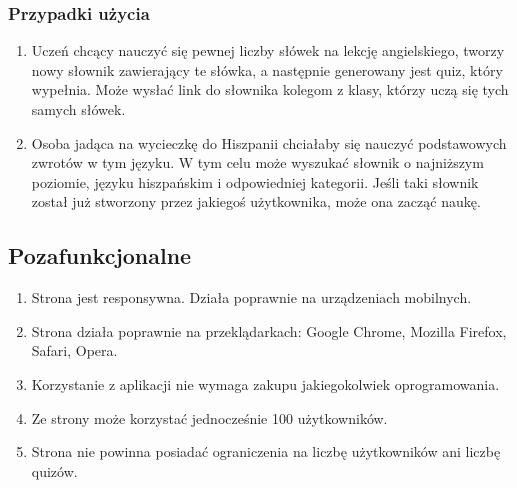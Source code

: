 \documentclass[a4paper,10pt]{article}
\begin{document}
\subsubsection{Przypadki użycia}
\begin{enumerate}
\item Uczeń chcący nauczyć się pewnej liczby słówek na lekcję angielskiego, tworzy nowy słownik zawierający te słówka, a następnie generowany jest quiz, który wypełnia. Może wysłać link do słownika kolegom z klasy, którzy uczą się tych samych słówek.
\item Osoba jadąca na wycieczkę do Hiszpanii chciałaby się nauczyć podstawowych zwrotów w tym języku. W tym celu może wyszukać słownik o najniższym poziomie, języku hiszpańskim i odpowiedniej kategorii. Jeśli taki słownik został już stworzony przez jakiegoś użytkownika, może ona zacząć naukę.
\end{enumerate}
\subsection{Pozafunkcjonalne}
\begin{enumerate}
\item Strona jest responsywna. Działa poprawnie na urządzeniach mobilnych.
\item Strona działa poprawnie na przeklądarkach: Google Chrome, Mozilla Firefox, Safari, Opera.
\item Korzystanie z aplikacji nie wymaga zakupu jakiegokolwiek oprogramowania.
\item Ze strony może korzystać jednocześnie 100 użytkowników.
\item Strona nie powinna posiadać ograniczenia na liczbę użytkowników ani liczbę quizów. 
\end{enumerate}
\end{document}
